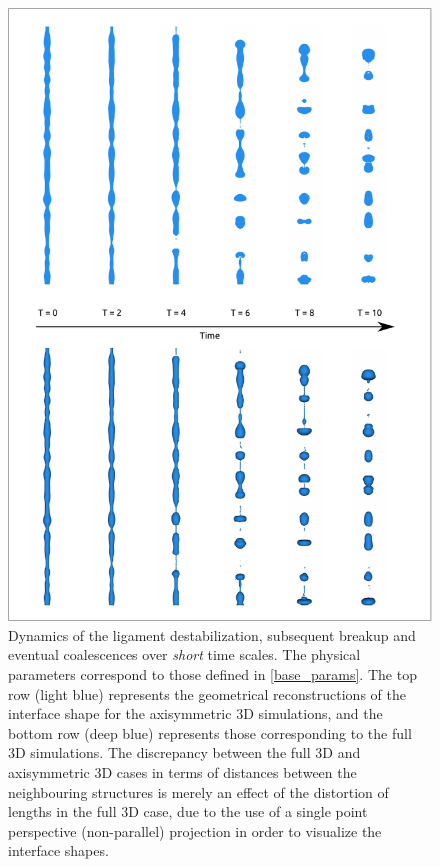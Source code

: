 \begin{figure}
\centering
\includegraphics{plots/ligament_breakup/3d_vs_2d_short_new.pdf}
	\caption{Dynamics of the ligament destabilization, subsequent breakup 
	and eventual coalescences over \textit{short} time scales. 
	The physical parameters correspond to those defined in \eqref{base_params}.
	The top row (light blue) represents the geometrical reconstructions of 
	the interface shape for the axisymmetric 3D simulations, and the bottom 
	row (deep blue) represents those corresponding to the full 3D simulations.
	The discrepancy between the full 3D and axisymmetric 3D cases in terms of distances between
	the neighbouring structures is merely an effect of the distortion of lengths
	in the full 3D case, due to the use of a single point perspective (non-parallel) 
	projection in order to visualize the interface shapes. 
	}
\label{2d_3d_short}
\end{figure}


